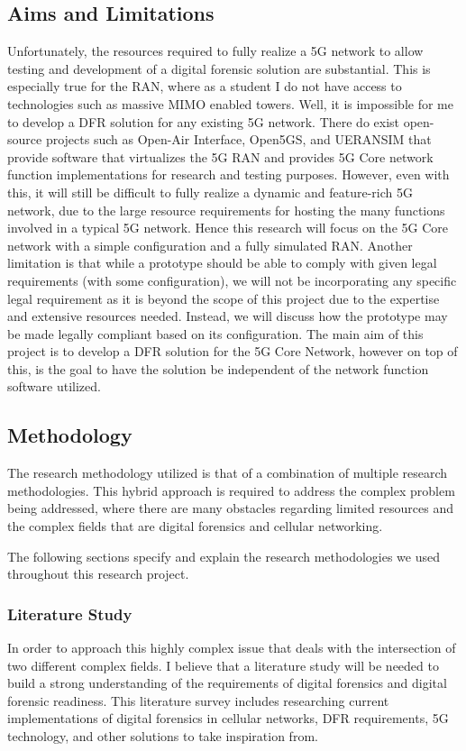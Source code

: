 \documentclass[final,1p,times,authoryear]{elsarticle}
\begin{document}
\subsection{Aims and Limitations}
\label{sub1sec5}
Unfortunately, the resources required to fully realize a 5G network to allow testing and development of a digital forensic solution are substantial. This is especially true for the RAN, where as a student I do not have access to technologies such as massive MIMO enabled towers. Well, it is impossible for me to develop a DFR solution for any existing 5G network. There do exist open-source projects such as Open-Air Interface, Open5GS, and UERANSIM that provide software that virtualizes the 5G RAN and provides 5G Core network function implementations for research and testing purposes. However, even with this, it will still be difficult to fully realize a dynamic and feature-rich 5G network, due to the large resource requirements for hosting the many functions involved in a typical 5G network. Hence this research will focus on the 5G Core network with a simple configuration and a fully simulated RAN. Another limitation is that while a prototype should be able to comply with given legal requirements (with some configuration), we will not be incorporating any specific legal requirement as it is beyond the scope of this project due to the expertise and extensive resources needed. Instead, we will discuss how the prototype may be made legally compliant based on its configuration. The main aim of this project is to develop a DFR solution for the 5G Core Network, however on top of this, is the goal to have the solution be independent of the network function software utilized.

\subsection{Methodology}
\label{sub1sec6}
The research methodology utilized is that of a combination of multiple research methodologies. This hybrid approach is required to address the complex problem being addressed, where there are many obstacles regarding limited resources and the complex fields that are digital forensics and cellular networking.

\vspace{1em}

The following sections specify and explain the research methodologies we used throughout this research project.

\subsubsection{Literature Study}
\label{sub1sub6sec1}
In order to approach this highly complex issue that deals with the intersection of two different complex fields. I believe that a literature study will be needed to build a strong understanding of the requirements of digital forensics and digital forensic readiness. This literature survey includes researching current implementations of digital forensics in cellular networks, DFR requirements, 5G technology, and other solutions to take inspiration from.
\end{document}
